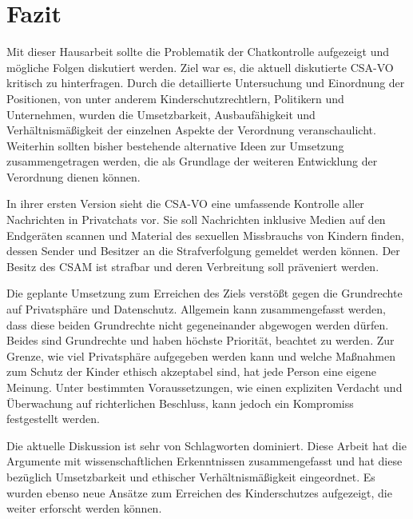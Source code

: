 \chapter{Fazit} %
\label{ch:Fazit}


Mit dieser Hausarbeit sollte die Problematik der Chatkontrolle aufgezeigt und mögliche Folgen diskutiert werden. Ziel war es, die aktuell diskutierte \ac{CSA-VO} kritisch zu hinterfragen. Durch die detaillierte Untersuchung und Einordnung der Positionen, von unter anderem Kinderschutzrechtlern, Politikern und Unternehmen, wurden die Umsetzbarkeit, Ausbaufähigkeit und Verhältnismäßigkeit der einzelnen Aspekte der Verordnung veranschaulicht. Weiterhin sollten bisher bestehende alternative Ideen zur Umsetzung zusammengetragen werden, die als Grundlage der weiteren Entwicklung der Verordnung dienen können.

In ihrer ersten Version sieht die \ac{CSA-VO} eine umfassende Kontrolle aller Nachrichten in Privatchats vor. Sie soll Nachrichten inklusive Medien auf den Endgeräten scannen und Material des sexuellen Missbrauchs von Kindern finden, dessen Sender und Besitzer an die Strafverfolgung gemeldet werden können. Der Besitz des \ac{CSAM} ist strafbar und deren Verbreitung soll präveniert werden.

Die geplante Umsetzung zum Erreichen des Ziels verstößt gegen die Grundrechte auf Privatsphäre und Datenschutz. Allgemein kann zusammengefasst werden, dass diese beiden Grundrechte nicht gegeneinander abgewogen werden dürfen. Beides sind Grundrechte und haben höchste Priorität, beachtet zu werden. Zur Grenze, wie viel Privatsphäre aufgegeben werden kann und welche Maßnahmen zum Schutz der Kinder ethisch akzeptabel sind, hat jede Person eine eigene Meinung. Unter bestimmten Voraussetzungen, wie einen expliziten Verdacht und Überwachung auf richterlichen Beschluss, kann jedoch ein Kompromiss festgestellt werden.

Die aktuelle Diskussion ist sehr von Schlagworten dominiert. Diese Arbeit hat die Argumente mit wissenschaftlichen Erkenntnissen zusammengefasst und hat diese bezüglich Umsetzbarkeit und ethischer Verhältnismäßigkeit eingeordnet. Es wurden ebenso neue Ansätze zum Erreichen des Kinderschutzes aufgezeigt, die weiter erforscht werden können.

